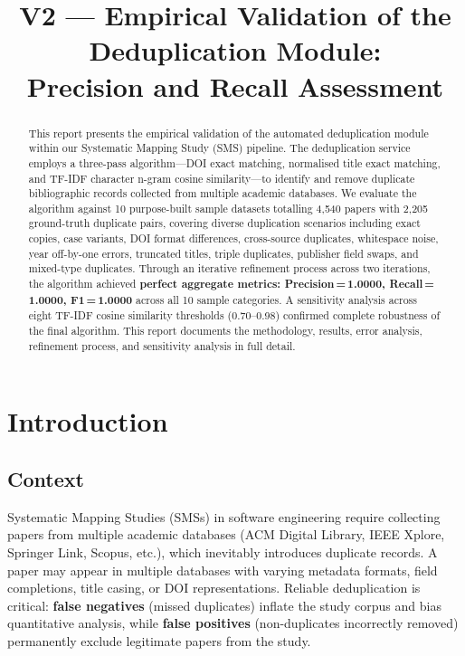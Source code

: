 \documentclass[conference]{IEEEtran}
\title{V2 --- Empirical Validation of the Deduplication Module:\\ Precision and Recall Assessment}
\author{\IEEEauthorblockN{SMS Pipeline --- Empirical Validation Series}}
\begin{document}
\maketitle

\begin{abstract}
This report presents the empirical validation of the automated deduplication module within our Systematic Mapping Study (SMS) pipeline. The deduplication service employs a three-pass algorithm---DOI exact matching, normalised title exact matching, and TF-IDF character n-gram cosine similarity---to identify and remove duplicate bibliographic records collected from multiple academic databases. We evaluate the algorithm against 10 purpose-built sample datasets totalling 4{,}540 papers with 2{,}205 ground-truth duplicate pairs, covering diverse duplication scenarios including exact copies, case variants, DOI format differences, cross-source duplicates, whitespace noise, year off-by-one errors, truncated titles, triple duplicates, publisher field swaps, and mixed-type duplicates. Through an iterative refinement process across two iterations, the algorithm achieved \textbf{perfect aggregate metrics: Precision\,=\,1.0000, Recall\,=\,1.0000, F1\,=\,1.0000} across all 10 sample categories. A sensitivity analysis across eight TF-IDF cosine similarity thresholds (0.70--0.98) confirmed complete robustness of the final algorithm. This report documents the methodology, results, error analysis, refinement process, and sensitivity analysis in full detail.
\end{abstract}

\section{Introduction}

\subsection{Context}

Systematic Mapping Studies (SMSs) in software engineering require collecting papers from multiple academic databases (ACM Digital Library, IEEE Xplore, Springer Link, Scopus, etc.), which inevitably introduces duplicate records. A paper may appear in multiple databases with varying metadata formats, field completions, title casing, or DOI representations. Reliable deduplication is critical: \textbf{false negatives} (missed duplicates) inflate the study corpus and bias quantitative analysis, while \textbf{false positives} (non-duplicates incorrectly removed) permanently exclude legitimate papers from the study.
\end{document}
